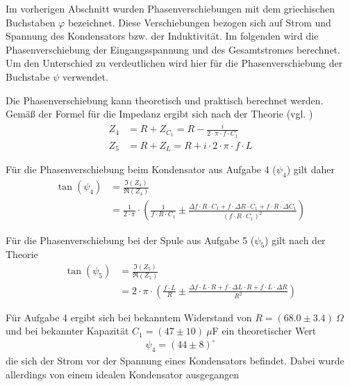 \documentclass{article}
\begin{document}
Im vorherigen Abschnitt wurden Phasenverschiebungen mit dem griechischen Buchstaben $\varphi$ bezeichnet. Diese Verschiebungen bezogen sich auf Strom und Spannung des Kondensators bzw. der Induktivität. Im folgenden wird die Phasenverschiebung der Eingangsspannung und des Gesamtstromes berechnet. Um den Unterschied zu verdeutlichen wird hier für die Phasenverschiebung der Buchstabe $\psi$ verwendet.


Die Phasenverschiebung kann theoretisch und praktisch berechnet werden. Gemäß der Formel für die Impedanz ergibt sich nach der Theorie (vgl. \cite{demtroeder})
\begin{align*}
Z_4 &= R + Z_{C_1} = R - \frac{i}{2\cdot\pi\cdot f \cdot C_1} \\
Z_5 &= R + Z_{L} = R + i\cdot 2\cdot\pi\cdot f \cdot L
\end{align*}

Für die Phasenverschiebung beim Kondensator aus Aufgabe 4 ($\psi_4$) gilt daher
\begin{align}\nonumber
\tan\left(\psi_4\right) &= \frac{\Im(Z_4)}{\Re(Z_4)} \\
&= \frac{1}{2\cdot\pi} \cdot\left(\frac{1}{ f\cdot R \cdot C_1} \pm  \frac{\Delta f\cdot R \cdot C_1 + f\cdot \Delta R \cdot C_1 + f\cdot R \cdot \Delta C_1}{ (f \cdot R\cdot C_1)^2} \right)
\end{align}

Für die Phasenverschiebung bei der Spule aus Aufgabe 5 ($\psi_5$) gilt nach der Theorie
\begin{align}\nonumber
\tan\left(\psi_5\right) &= \frac{\Im(Z_5)}{\Re(Z_5)} \\
&= 2\cdot \pi\cdot \left( \frac{f \cdot L}{R} \pm \frac{\Delta f\cdot L\cdot R + f\cdot \Delta L\cdot R + f\cdot L \cdot \Delta R}{R^2} \right)\label{eq:phase_spule}
\end{align}


Für Aufgabe 4 ergibt sich bei bekanntem Widerstand von $R=(68.0\pm3.4)~\Omega$ und bei bekannter Kapazität $C_1 = (47\pm10)~\mu$F ein theoretischer Wert 
\begin{align*}
\psi_4 = (44 \pm 8)^\circ
\end{align*}
 die sich der Strom vor der Spannung eines Kondensators befindet. Dabei wurde allerdings von einem idealen Kondensator ausgegangen 
\end{document}
